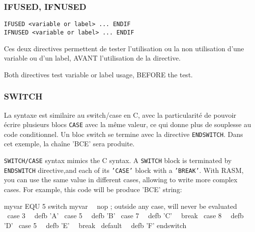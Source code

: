 \subsubsection{IFUSED, IFNUSED}
\begin{verbatim}
IFUSED <variable or label> ... ENDIF
IFNUSED <variable or label> ... ENDIF
\end{verbatim}

\begin{xfr}
Ces deux directives permettent de tester l'utilisation ou la non utilisation d'une variable ou d'un label, AVANT l'utilisation de la directive.
\end{xfr}

\begin{xen}
Both directives test variable or label usage, BEFORE the test.
\end{xen}

\subsubsection{SWITCH}

\begin{xfr}
La syntaxe est similaire au switch/case en C, avec la particularité de pouvoir écrire plusieurs blocs \texttt{CASE} avec la même valeur, ce qui donne plus de souplesse au code conditionnel. Un bloc switch se termine avec la directive \texttt{ENDSWITCH}.
Dans cet exemple, la chaîne 'BCE' sera produite.
\end{xfr}

\begin{xen}
\texttt{SWITCH/CASE} syntax mimics the C syntax.  A \texttt{SWITCH} block is terminated by \texttt{ENDSWITCH} directive,and each of its \texttt{'CASE'} block with a \texttt{'BREAK'}. With RASM, you can use the same value in different cases, allowing to write more complex cases. For example, this code will be produce 'BCE' string:
\end{xen}

\begin{code}
myvar EQU 5
\medskip
switch myvar
\ \ nop 		; outside any case, will never be evaluated
\ case 3
\ \ defb 'A'
\ case 5
\ \ defb 'B'
\ case 7
\ \ defb 'C'
\ \ break
\ case 8
\ \ defb 'D'
\ case 5
\ \ defb 'E'
\ \ break
\ default
\ \ defb 'F'
endswitch
\end{code}


\subsection{}



